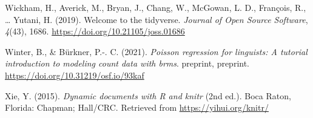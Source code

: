 \documentclass[
  11pt,
  english,
  ,doc,mask,floatsintext]{apa6}
\newlength{\cslhangindent}
\newlength{\cslentryspacingunit} %
\newenvironment{CSLReferences}[2] %
 {%
  \setlength{\parindent}{0pt}
  \ifodd #1
  \let\oldpar\par
  \def\par{\hangindent=\cslhangindent\oldpar}
  \fi
  \setlength{\parskip}{#2\cslentryspacingunit}
 }%
 {}
\begin{document}
\begin{CSLReferences}{1}{0}
\leavevmode{}%
Wickham, H., Averick, M., Bryan, J., Chang, W., McGowan, L. D., François, R., \ldots{} Yutani, H. (2019). Welcome to the {tidyverse}. \emph{Journal of Open Source Software}, \emph{4}(43), 1686. \url{https://doi.org/10.21105/joss.01686}

\leavevmode{}%
Winter, B., \& Bürkner, P.-. C. (2021). \emph{Poisson regression for linguists: A tutorial introduction to modeling count data with brms}. preprint, preprint. \url{https://doi.org/10.31219/osf.io/93kaf}

\leavevmode{}%
Xie, Y. (2015). \emph{Dynamic documents with {R} and knitr} (2nd ed.). Boca Raton, Florida: Chapman; Hall/CRC. Retrieved from \url{https://yihui.org/knitr/}

\end{CSLReferences}
\end{document}
